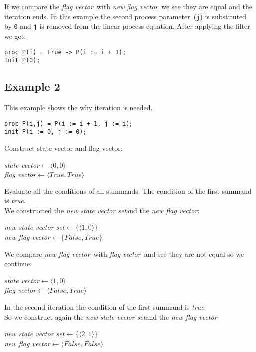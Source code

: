 \documentclass[a4paper,10pt]{article}
\newcommand{\lpe}{linear process equation}
\newcommand{\pp}{process parameter}
\newcommand{\ti}{\textit}
\newcommand{\sv}{\textit{state vector}}
\newcommand{\fv}{\textit{flag vector}}
\newcommand{\svs}{\textit{new state vector set}}
\newcommand{\nfv}{\textit{new flag vector}}
\newcommand{\la}{$\leftarrow$}
\begin{document}
If we compare the \fv\ with \ti{new} \fv\ we see they are equal and the iteration ends.
In this example the second \pp\ (\verb"j") is substituted by \verb"0" and \verb"j" is removed from the \lpe.
After applying the filter we get:\\
\begin{verbatim}
proc P(i) = true -> P(i := i + 1);
Init P(0);
\end{verbatim}

\subsection{Example 2}
This example shows the why iteration is needed.
\begin{verbatim}
proc P(i,j) = P(i := i + 1, j := i);
init P(i := 0, j := 0); 
\end{verbatim}
 
Construct state vector and flag vector: 
\begin{center}\begin{minipage}{250pt}
\sv \la  $\langle 0 , 0 \rangle$\\
\fv \la  $\langle True , True \rangle$\\
\end{minipage}\end{center}

Evaluate all the conditions of all summands.
The condition of the first summand is \ti{true}.\\

We constructed the \svs and the \nfv :
\begin{center}\begin{minipage}{250pt}
\svs \la  $\lbrace \langle 1 , 0 \rangle \rbrace $\\
\nfv \la  $\lbrace False , True \rbrace $\\
\end{minipage}\end{center}

We compare \ti{new} \fv\ with \fv\ and see they are not equal so we continue:
\begin{center}\begin{minipage}{250pt}
\sv \la $\langle 1 , 0 \rangle $\\
\fv \la $\langle False , True \rangle $\\
\end{minipage}\end{center}

In the second iteration the condition of the first summand is \ti{true}.\\
So we construct again the \svs and the \nfv\: 
\begin{center}\begin{minipage}{250pt}
\svs \la  $\lbrace \langle 2 , 1 \rangle \rbrace $\\
\nfv \la  $\langle False , False \rangle $ \\
\end{minipage}\end{center}
\end{document}

